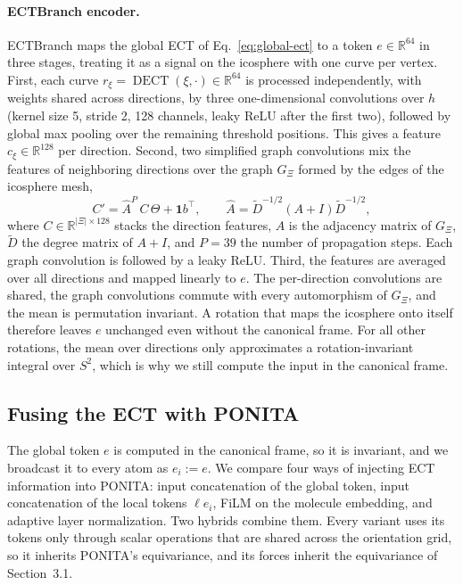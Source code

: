 \documentclass{article}
\newcommand{\R}{\mathbb{R}}
\newcommand{\DECT}{\operatorname{DECT}}
\begin{document}
\paragraph{ECTBranch encoder.}
ECTBranch maps the global ECT of Eq.~\eqref{eq:global-ect} to a token $e\in\R^{64}$ in three stages, treating it as a signal on the icosphere with one curve per vertex. First, each curve $r_\xi = \DECT(\xi,\cdot)\in\R^{64}$ is processed independently, with weights shared across directions, by three one-dimensional convolutions over $h$ (kernel size 5, stride 2, 128 channels, leaky ReLU after the first two), followed by global max pooling over the remaining threshold positions. This gives a feature $c_\xi\in\R^{128}$ per direction. Second, two simplified graph convolutions \citep{wu2019sgc} mix the features of neighboring directions over the graph $G_\Xi$ formed by the edges of the icosphere mesh,
\begin{equation}
  C' = \hat A^{P}\, C\,\Theta + \mathbf{1}b^\top, \qquad \hat A = \tilde D^{-1/2}(A+I)\tilde D^{-1/2},
  \label{eq:sgc}
\end{equation}
where $C\in\R^{|\Xi|\times 128}$ stacks the direction features, $A$ is the adjacency matrix of $G_\Xi$, $\tilde D$ the degree matrix of $A+I$, and $P = 39$ the number of propagation steps. Each graph convolution is followed by a leaky ReLU.
Third, the features are averaged over all directions and mapped linearly to $e$. The per-direction convolutions are shared, the graph convolutions commute with every automorphism of $G_\Xi$, and the mean is permutation invariant. A rotation that maps the icosphere onto itself therefore leaves $e$ unchanged even without the canonical frame. For all other rotations, the mean over directions only approximates a rotation-invariant integral over $S^2$, which is why we still compute the input in the canonical frame.

\subsection{Fusing the ECT with PONITA}
\label{sec:fusion}
The global token $e$ is computed in the canonical frame, so it is invariant, and we broadcast it to every atom as $e_i := e$. We compare four ways of injecting ECT information into PONITA: input concatenation of the global token, input concatenation of the local tokens $\ell e_i$, FiLM on the molecule embedding, and adaptive layer normalization. Two hybrids combine them. Every variant uses its tokens only through scalar operations that are shared across the orientation grid, so it inherits PONITA's equivariance, and its forces inherit the equivariance of Section~3.1.
\end{document}

